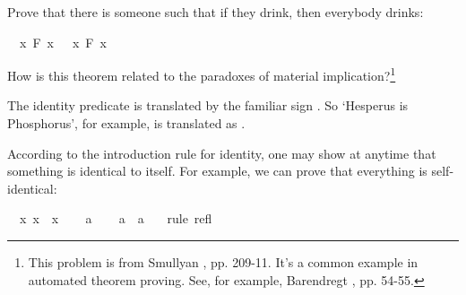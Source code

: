 \begin{isabellebody}
\begin{isamarkuptext}
\begin{Exercise}[title = {The Drinker Principle}, label = drinker] 
Prove that there is someone such that if they drink, then everybody drinks: \end{Exercise}%
\end{isamarkuptext}\isamarkuptrue%
\isamarkupfalse%
\ {\isachardoublequoteopen}{\isasymexists}\ x{\isachardot}\ F\ x\ {\isasymlongrightarrow}\ {\isacharparenleft}{\isasymforall}\ x{\isachardot}\ F\ x{\isacharparenright}{\isachardoublequoteclose}%
\isadelimproof
\ %
\endisadelimproof
%
\isatagproof
{}\isamarkupfalse%
%
\endisatagproof
{\isafoldproof}%
%
\isadelimproof
%
\endisadelimproof
%
\begin{isamarkuptext}%
How is this theorem related to the paradoxes of material implication?\footnote{This problem
is from Smullyan \cite{smullyan_what_1978}, pp. 209-11. It's a common example in automated theorem
proving. See, for example, Barendregt \cite{barendregt_quest_1996}, pp. 54-55.}%
\end{isamarkuptext}\isamarkuptrue%
%
\isadelimdocument
%
\endisadelimdocument
%
\isatagdocument
%
\isamarkuptrue%
%
\endisatagdocument
{\isafolddocument}%
%
\isadelimdocument
%
\endisadelimdocument
%
\begin{isamarkuptext}%
The identity predicate is translated by the familiar sign \isa{{\isacharequal}}. So `Hesperus is Phosphorus',
for example, is translated as .%
\end{isamarkuptext}\isamarkuptrue%
%
\isadelimdocument
%
\endisadelimdocument
%
\isatagdocument
%
\isamarkuptrue%
%
\endisatagdocument
{\isafolddocument}%
%
\isadelimdocument
%
\endisadelimdocument
%
\begin{isamarkuptext}%
According to the introduction rule for identity, one may show at anytime that something is
identical to itself. For example, we can prove that everything is self-identical:%
\end{isamarkuptext}\isamarkuptrue%
\isamarkupfalse%
\ {\isachardoublequoteopen}{\isasymforall}\ x{\isachardot}\ x\ {\isacharequal}\ x{\isachardoublequoteclose}\isanewline
%
\isadelimproof
%
\endisadelimproof
%
\isatagproof
{}\isamarkupfalse%
\isanewline
\ \ \isamarkupfalse%
\ a\isanewline
\ \ \isamarkupfalse%
\ {\isachardoublequoteopen}a\ {\isacharequal}\ a\ {\isachardoublequoteclose}\ \isamarkupfalse%
\ {\isacharparenleft}rule\ refl{\isacharparenright}\isanewline

\end{isabellebody}
